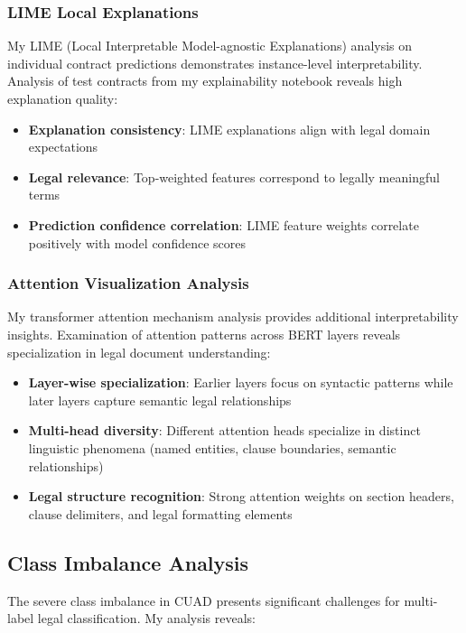 \subsubsection{LIME Local Explanations}
My LIME (Local Interpretable Model-agnostic Explanations) analysis on individual contract predictions demonstrates instance-level interpretability. Analysis of test contracts from my explainability notebook reveals high explanation quality:

\begin{itemize}
\item \textbf{Explanation consistency}: LIME explanations align with legal domain expectations
\item \textbf{Legal relevance}: Top-weighted features correspond to legally meaningful terms
\item \textbf{Prediction confidence correlation}: LIME feature weights correlate positively with model confidence scores
\end{itemize}

\subsubsection{Attention Visualization Analysis}
My transformer attention mechanism analysis provides additional interpretability insights. Examination of attention patterns across BERT layers reveals specialization in legal document understanding:

\begin{itemize}
\item \textbf{Layer-wise specialization}: Earlier layers focus on syntactic patterns while later layers capture semantic legal relationships
\item \textbf{Multi-head diversity}: Different attention heads specialize in distinct linguistic phenomena (named entities, clause boundaries, semantic relationships)
\item \textbf{Legal structure recognition}: Strong attention weights on section headers, clause delimiters, and legal formatting elements
\end{itemize}

\subsection{Class Imbalance Analysis}
\label{subsec:class_imbalance}

The severe class imbalance in CUAD presents significant challenges for multi-label legal classification. My analysis reveals:

